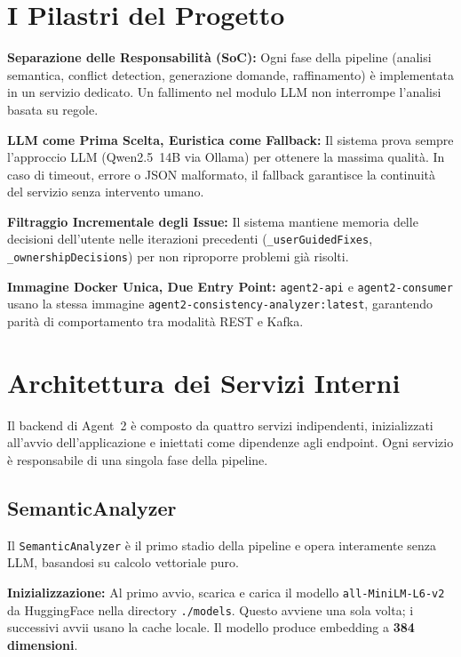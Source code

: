 \documentclass[12pt,a4paper]{report}
\begin{document}
\section{I Pilastri del Progetto}

\textbf{Separazione delle Responsabilità (SoC):} Ogni fase della pipeline (analisi
semantica, conflict detection, generazione domande, raffinamento) è implementata
in un servizio dedicato. Un fallimento nel modulo LLM non interrompe
l'analisi basata su regole.

\textbf{LLM come Prima Scelta, Euristica come Fallback:} Il sistema prova sempre
l'approccio LLM (Qwen2.5~14B via Ollama) per ottenere la massima qualità.
In caso di timeout, errore o JSON malformato, il fallback garantisce la
continuità del servizio senza intervento umano.

\textbf{Filtraggio Incrementale degli Issue:} Il sistema mantiene memoria delle
decisioni dell'utente nelle iterazioni precedenti (\texttt{\_userGuidedFixes},
\texttt{\_ownershipDecisions}) per non riproporre problemi già risolti.

\textbf{Immagine Docker Unica, Due Entry Point:} \texttt{agent2-api} e
\texttt{agent2-consumer} usano la stessa immagine \texttt{agent2-consistency-analyzer:latest},
garantendo parità di comportamento tra modalità REST e Kafka.

\section{Architettura dei Servizi Interni}

Il backend di Agent~2 è composto da quattro servizi indipendenti, inizializzati
all'avvio dell'applicazione e iniettati come dipendenze agli endpoint.
Ogni servizio è responsabile di una singola fase della pipeline.

\subsection{SemanticAnalyzer}

Il \texttt{SemanticAnalyzer} è il primo stadio della pipeline e opera interamente
senza LLM, basandosi su calcolo vettoriale puro.

\textbf{Inizializzazione:} Al primo avvio, scarica e carica il modello
\texttt{all-MiniLM-L6-v2} da HuggingFace nella directory \texttt{./models}.
Questo avviene una sola volta; i successivi avvii usano la cache locale.
Il modello produce embedding a \textbf{384 dimensioni}.
\end{document}
